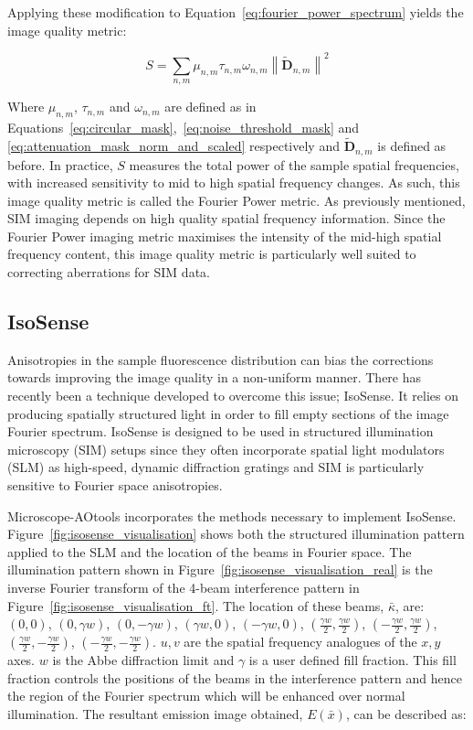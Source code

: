 Applying these modification to Equation~\ref{eq:fourier_power_spectrum} 
yields the image quality metric:

\begin{equation}\label{eq:Fourier_power_metric}
S = \sum\limits_{n,m}{\mu_{n,m}\tau_{n,m}\omega_{n,m}\left\| \tilde{\textbf{D}}_{n,m} \right\|^2}
\end{equation}

Where $\mu_{n,m}$, $\tau_{n,m}$ and $\omega_{n,m}$ are defined as in
Equations~\ref{eq:circular_mask},~\ref{eq:noise_threshold_mask} and
\ref{eq:attenuation_mask_norm_and_scaled} respectively and 
$\tilde{\textbf{D}}_{n,m}$ is defined as before. In practice, $S$
measures the total power of the sample spatial frequencies, with 
increased sensitivity to mid to high spatial frequency changes. As
such, this image quality metric is called the Fourier Power metric.
As previously mentioned, SIM imaging depends on high quality spatial 
frequency information.\cite{debarre2008adaptive,thomas2015enhanced} 
Since the Fourier Power imaging metric maximises the intensity of 
the mid-high spatial frequency content, this image quality metric 
is particularly well suited to correcting aberrations for SIM data.

\subsection{IsoSense}
\label{subsec:isosense}

Anisotropies in the sample fluorescence distribution can bias 
the corrections towards improving the image quality in a 
non-uniform manner. There has recently been a technique developed 
to overcome  this issue; IsoSense\cite{vzurauskas2019isosense}. 
It relies  on producing spatially structured light in order to fill 
empty sections of the image Fourier spectrum. IsoSense is designed 
to be used in structured illumination microscopy (SIM) setups since 
they often incorporate spatial light modulators (SLM) as high-speed, 
dynamic diffraction  gratings and SIM is particularly sensitive to 
Fourier space anisotropies.

Microscope-AOtools incorporates the methods necessary to implement
IsoSense. Figure~\ref{fig:isosense_visualisation} shows both
the structured illumination pattern applied to the SLM 
and the location of the beams in Fourier space. The illumination
pattern shown in Figure~\ref{fig:isosense_visualisation_real} is
the inverse Fourier transform of the 4-beam interference pattern 
in Figure~\ref{fig:isosense_visualisation_ft}. The location 
of these beams, $\bar{\kappa}$, are: 
$(0,0)$, $(0,\gamma w)$, $(0,-\gamma w)$, $(\gamma w, 0)$, 
$(-\gamma w, 0)$, $(\frac{\gamma w}{2}, \frac{\gamma w}{2})$, 
$(-\frac{\gamma w}{2}, \frac{\gamma w}{2})$, $(\frac{\gamma w}{2},
-\frac{\gamma w}{2})$, $(-\frac{\gamma w}{2}, 
-\frac{\gamma w}{2})$. $u,v$ are the spatial frequency 
analogues of the $x,y$ axes. $w$ is the Abbe diffraction limit and 
$\gamma$ is a user defined fill fraction. This fill
fraction controls the positions of the beams in the interference
pattern and hence the region of the Fourier spectrum which will 
be enhanced over normal illumination. The resultant emission image 
obtained, $E(\bar{x})$, can be described as:


